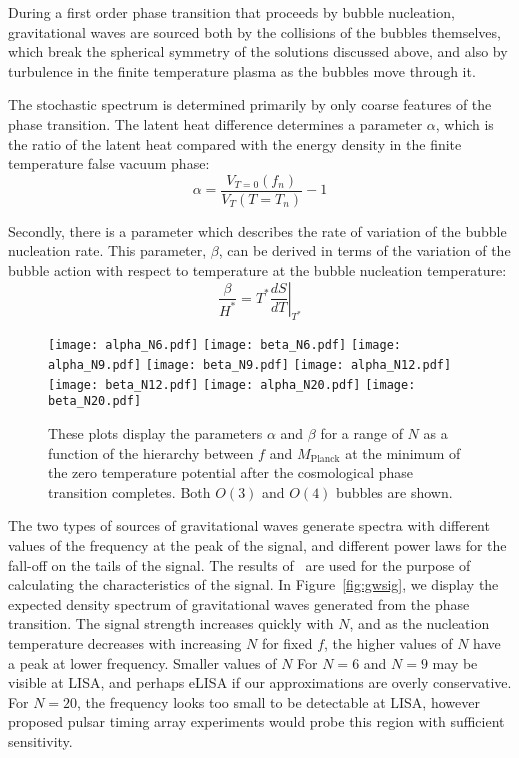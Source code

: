 \documentclass[12pt]{article}
\begin{document}
During a first order phase transition that proceeds by bubble nucleation, gravitational waves are sourced both by the collisions of the bubbles themselves, which break the spherical symmetry of the solutions discussed above, and also by turbulence in the finite temperature plasma as the bubbles move through it.

The stochastic spectrum is determined primarily by only coarse features of the phase transition.  The latent heat difference determines a parameter $\alpha$, which is the ratio of the latent heat compared with the energy density in the finite temperature false vacuum phase:
\begin{equation}
\alpha = \frac{ V_{T=0} (f_n) }{V_T (T = T_n)} - 1
\end{equation}

Secondly, there is a parameter which describes the rate of variation of the bubble nucleation rate.  This parameter, $\beta$, can be derived in terms of the variation of the bubble action with respect to temperature at the bubble nucleation temperature:
\begin{equation}
\frac{\beta}{H^*} = T^* \left. \frac{dS}{dT} \right|_{T^*}
\end{equation}

\begin{figure}[!htbp]
	\centering
	\texttt{[image: alpha\_N6.pdf]}
	\texttt{[image: beta\_N6.pdf]}
	\texttt{[image: alpha\_N9.pdf]}
	\texttt{[image: beta\_N9.pdf]}
	\texttt{[image: alpha\_N12.pdf]}
	\texttt{[image: beta\_N12.pdf]}
	\texttt{[image: alpha\_N20.pdf]}
	\texttt{[image: beta\_N20.pdf]}
\caption{These plots display the parameters $\alpha$ and $\beta$ for a range of $N$ as a function of the hierarchy between $f$ and $M_\text{Planck}$ at the minimum of the  zero temperature potential after the cosmological phase transition completes.  Both $O(3)$ and $O(4)$ bubbles are shown.}
\label{fig:alha}
\end{figure}


The two types of sources of gravitational waves generate spectra with different values of the frequency at the peak of the signal, and different power laws for the fall-off on the tails of the signal.  The results of~\cite{Grojean:2006bp} are used for the purpose of calculating the characteristics of the signal.  In Figure~\ref{fig:gwsig}, we display the expected density spectrum of gravitational waves generated from the phase transition.  The signal strength increases quickly with $N$, and as the nucleation temperature decreases with increasing $N$ for fixed $f$, the higher values of $N$ have a peak at lower frequency.  Smaller values of $N$ For $N = 6$ and $N=9$ may be visible at LISA, and perhaps eLISA if our approximations are overly conservative.  For $N=20$, the frequency looks too small to be detectable at LISA, however proposed pulsar timing array experiments would probe this region with sufficient sensitivity.
\end{document}
